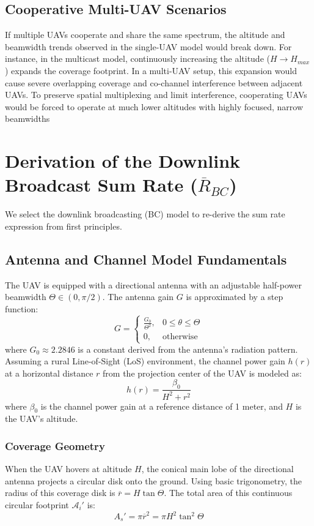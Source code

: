 \documentclass[11pt,a4paper]{article}
\begin{document}
    \subsection{Cooperative Multi-UAV Scenarios}
    If multiple UAVs cooperate and share the same spectrum, the altitude and beamwidth trends observed in the single-UAV model would break down. 
    For instance, in the multicast model, continuously increasing the altitude ($H \to H_{max}$) expands the coverage footprint.
    In a multi-UAV setup, this expansion would cause severe overlapping coverage and co-channel interference between adjacent UAVs.
    To preserve spatial multiplexing and limit interference, cooperating UAVs would be forced to operate at much lower altitudes with highly focused, narrow beamwidths

\section{Derivation of the Downlink Broadcast Sum Rate ($\overline{R}_{BC}$)}
We select the downlink broadcasting (BC) model to re-derive the sum rate expression from first principles.

    \subsection{Antenna and Channel Model Fundamentals}
    The UAV is equipped with a directional antenna with an adjustable half-power beamwidth $\Theta \in (0, \pi/2)$.
    The antenna gain $G$ is approximated by a step function:
    $$G = \begin{cases} \frac{G_0}{\Theta^2}, & 0 \le \theta \le \Theta \\ 0, & \text{otherwise} \end{cases}$$
    where $G_0 \approx 2.2846$ is a constant derived from the antenna's radiation pattern.
    Assuming a rural Line-of-Sight (LoS) environment, the channel power gain $h(r)$ at a horizontal distance $r$ from the projection center of the UAV is modeled as:
    $$h(r) = \frac{\beta_0}{H^2 + r^2}$$
    where $\beta_0$ is the channel power gain at a reference distance of 1 meter, and $H$ is the UAV's altitude.

        \subsubsection{Coverage Geometry}
        When the UAV hovers at altitude $H$, the conical main lobe of the directional antenna projects a circular disk onto the ground.
        Using basic trigonometry, the radius of this coverage disk is $\overline{r} = H \tan\Theta$.
        The total area of this continuous circular footprint $\mathcal{A}_i'$ is:
        $$A_s' = \pi \overline{r}^2 = \pi H^2 \tan^2\Theta$$
\end{document}
